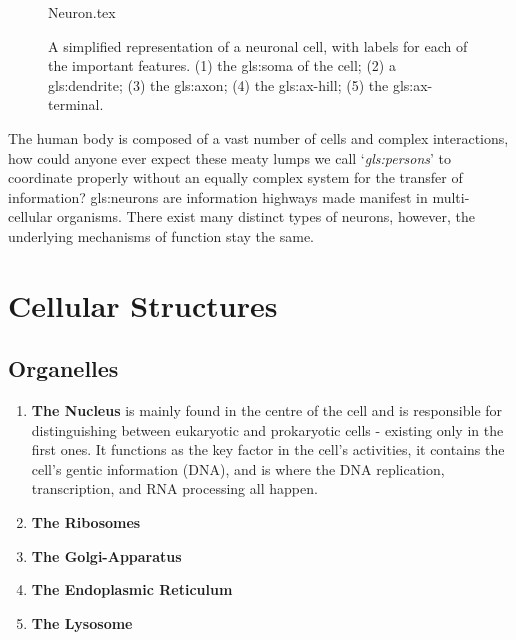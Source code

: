 \documentclass[../../Orator]{subfiles}
\begin{document}
\begin{figure}[h]
    \centering
    {Neuron.tex}
    \caption{A simplified representation of a neuronal cell, with labels for each of the important features. (1) the \gls{gls:soma} of the cell; (2) a \gls{gls:dendrite}; (3) the \gls{gls:axon}; (4) the \gls{gls:ax-hill}; (5) the \gls{gls:ax-terminal}.}\label{fig:Neuron}
\end{figure}

The human body is composed of a vast number of cells and complex interactions, how could anyone ever expect these meaty lumps we call `\textit{\glspl{gls:person}}' to coordinate properly without an equally complex system for the transfer of information? 
\Glspl{gls:neuron} are information highways made manifest in multi-cellular organisms. 
There exist many distinct types of neurons, however, the underlying mechanisms of function stay the same.

\section{Cellular Structures}
\subsection{Organelles}
\begin{enumerate}

    \item \textbf{The Nucleus} is mainly found in the centre of the cell and is responsible for distinguishing between eukaryotic and prokaryotic cells - existing only in the first ones. It functions as the key factor in the cell's activities, it contains the cell's gentic information (DNA), and is where the DNA replication, transcription, and RNA processing all happen.
    \item \textbf{The Ribosomes}
    \item \textbf{The Golgi-Apparatus}
    \item \textbf{The Endoplasmic Reticulum}
    \item \textbf{The Lysosome}
    
\end{enumerate}
\end{document}
